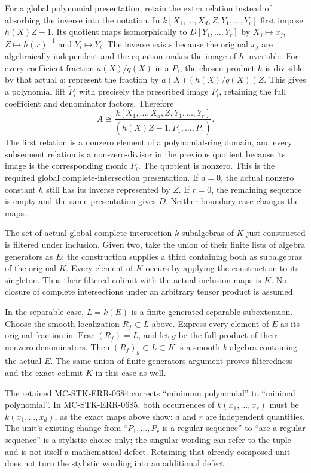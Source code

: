 For a global polynomial presentation, retain the extra relation instead of absorbing the inverse into the notation. In \(k[X_1,\ldots,X_d,Z,Y_1,\ldots,Y_r]\) first impose \(h(X)Z-1\). Its quotient maps isomorphically to \(D[Y_1,\ldots,Y_r]\) by \(X_j\mapsto x_j\), \(Z\mapsto h(x)^{-1}\) and \(Y_i\mapsto Y_i\). The inverse exists because the original \(x_j\) are algebraically independent and the equation makes the image of \(h\) invertible. For every coefficient fraction \(a(X)/q(X)\) in a \(P_i\), the chosen product \(h\) is divisible by that actual \(q\); represent the fraction by \(a(X)(h(X)/q(X))Z\). This gives a polynomial lift \(\widetilde P_i\) with precisely the prescribed image \(P_i\), retaining the full coefficient and denominator factors. Therefore \[
 A\cong
 \frac{k[X_1,\ldots,X_d,Z,Y_1,\ldots,Y_r]}
 {(h(X)Z-1,\widetilde P_1,\ldots,\widetilde P_r)}.
\] The first relation is a nonzero element of a polynomial-ring domain, and every subsequent relation is a non-zero-divisor in the previous quotient because its image is the corresponding monic \(P_i\). The quotient is nonzero. This is the required global complete-intersection presentation. If \(d=0\), the actual nonzero constant \(h\) still has its inverse represented by \(Z\). If \(r=0\), the remaining sequence is empty and the same presentation gives \(D\). Neither boundary case changes the maps.

The set of actual global complete-intersection \(k\)-subalgebras of \(K\) just constructed is filtered under inclusion. Given two, take the union of their finite lists of algebra generators as \(E\); the construction supplies a third containing both as subalgebras of the original \(K\). Every element of \(K\) occurs by applying the construction to its singleton. Thus their filtered colimit with the actual inclusion maps is \(K\). No closure of complete intersections under an arbitrary tensor product is assumed.

In the separable case, \(L=k(E)\) is a finite generated separable subextension. Choose the smooth localization \(R_f\subset L\) above. Express every element of \(E\) as its original fraction in \(\operatorname{Frac}(R_f)=L\), and let \(g\) be the full product of their nonzero denominators. Then \((R_f)_g\subset L\subset K\) is a smooth \(k\)-algebra containing the actual \(E\). The same union-of-finite-generators argument proves filteredness and the exact colimit \(K\) in this case as well.

The retained MC-\AlgebraIdentifierBreak{}STK-\AlgebraIdentifierBreak{}ERR-\AlgebraIdentifierBreak{}0684 corrects ``minimum polynomial'' to ``minimal polynomial''. In MC-\AlgebraIdentifierBreak{}STK-\AlgebraIdentifierBreak{}ERR-\AlgebraIdentifierBreak{}0685, both occurrences of \(k(x_1,\ldots,x_r)\) must be \(k(x_1,\ldots,x_d)\), as the exact maps above show: \(d\) and \(r\) are independent quantities. The unit's existing change from ``\(P_1,\ldots,P_r\) is a regular sequence'' to ``are a regular sequence'' is a stylistic choice only; the singular wording can refer to the tuple and is not itself a mathematical defect. Retaining that already composed unit does not turn the stylistic wording into an additional defect.

